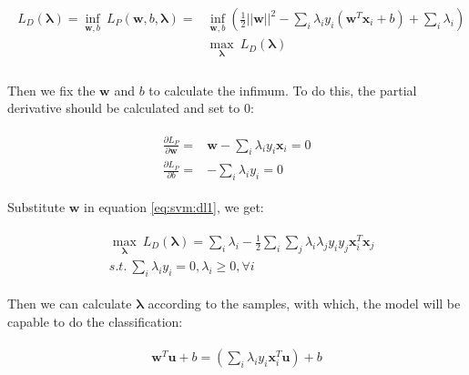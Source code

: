 \begin{align}
\begin{split}
L_D(\mathbf{\lambda}) = \inf_{\mathbf{w}, b} \ L_P(\mathbf{w}, b, \mathbf{\lambda}) =& \inf_{\mathbf{w}, b} \left( \frac{1}{2}||\mathbf{w}||^2 - \sum_i\lambda_i y_i(\mathbf{w}^T\mathbf{x}_i+b) + \sum_i\lambda_i \right)\\
&\max_\mathbf{\lambda} \ L_D(\mathbf{\lambda}) \\
\label{eq:svm:dl1}
\end{split}
\end{align}

Then we fix the $\mathbf{w}$ and $b$ to calculate the infimum. 
To do this, the partial derivative should be calculated and set to $0$:

\begin{align}
\begin{split}
\frac{\partial{L_P}}{\partial{\mathbf{w}}} =& \mathbf{w} - \sum_i\lambda_iy_i\mathbf{x}_i = 0 \\
\frac{\partial{L_P}}{\partial{b}} =& -\sum_i\lambda_iy_i = 0
\end{split}
\end{align}

Substitute $\mathbf{w}$ in equation \ref{eq:svm:dl1}, we get:

\begin{align}
\begin{split}
&\max_\mathbf{\lambda} \ L_D(\mathbf{\lambda}) = \sum_i\lambda_i - \frac{1}{2} \sum_i\sum_j\lambda_i\lambda_jy_iy_j\mathbf{x}_i^T\mathbf{x}_j\\
 &s.t. \ \sum_i\lambda_iy_i = 0, \lambda_i \geq 0, \forall i
\label{eq:svm:dl2}
\end{split}
\end{align}

Then we can calculate $\mathbf{\lambda}$ according to the samples, with which, the model will be capable to do the classification:

\begin{align}
\begin{split}
\mathbf{w}^T \mathbf{u} + b =  \left(\sum_i\lambda_iy_i\mathbf{x}_i^T\mathbf{u}\right) + b 
\end{split}
\end{align}



